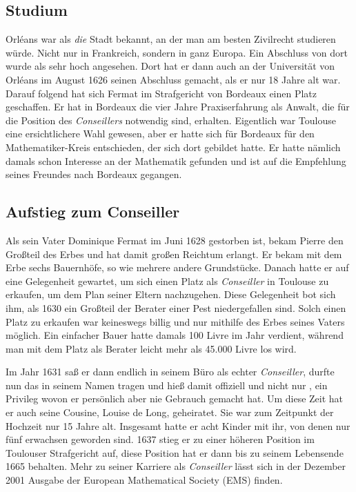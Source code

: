 \subsection{Studium} \label{sec:studium}
Orléans war als \textit{die} Stadt bekannt, an der man am besten Zivilrecht studieren würde. Nicht nur in Frankreich, sondern in ganz Europa. Ein Abschluss von dort wurde als sehr hoch angesehen. Dort hat er dann auch an der Universität von Orléans im August 1626 seinen Abschluss gemacht, als er nur 18 Jahre alt war. Darauf folgend hat sich Fermat im Strafgericht von Bordeaux einen Platz geschaffen. Er hat in Bordeaux die vier Jahre Praxiserfahrung als Anwalt, die für die Position des \textit{Conseillers} notwendig sind, erhalten. Eigentlich war Toulouse eine ersichtlichere Wahl gewesen, aber er hatte sich für Bordeaux für den Mathematiker-Kreis entschieden, der sich dort gebildet hatte. Er hatte nämlich damals schon Interesse an der Mathematik gefunden und ist auf die Empfehlung seines Freundes nach Bordeaux gegangen.

\subsection{Aufstieg zum Conseiller} \label{sec:aufstieg}
Als sein Vater Dominique Fermat im Juni 1628 gestorben ist, bekam Pierre den Großteil des Erbes und hat damit großen Reichtum erlangt. Er bekam mit dem Erbe sechs Bauernhöfe, so wie mehrere andere Grundstücke. Danach hatte er auf eine Gelegenheit gewartet, um sich einen Platz als \textit{Conseiller} in Toulouse zu erkaufen, um dem Plan seiner Eltern nachzugehen. Diese Gelegenheit bot sich ihm, als 1630 ein Großteil der Berater einer Pest niedergefallen sind. Solch einen Platz zu erkaufen war keineswegs billig und nur mithilfe des Erbes seines Vaters möglich. Ein einfacher Bauer hatte damals 100 Livre im Jahr verdient, während man mit dem Platz als Berater leicht mehr als 45.000 Livre los wird.

Im Jahr 1631 saß er dann endlich in seinem Büro als echter \textit{Conseiller}, durfte nun das \textit{} in seinem Namen tragen und hieß damit offiziell  und nicht nur , ein Privileg wovon er persönlich aber nie Gebrauch gemacht hat. Um diese Zeit hat er auch seine Cousine, Louise de Long, geheiratet. Sie war zum Zeitpunkt der Hochzeit nur 15 Jahre alt. Insgesamt hatte er acht Kinder mit ihr, von denen nur fünf erwachsen geworden sind. 1637 stieg er zu einer höheren Position im Toulouser Strafgericht auf, diese Position hat er dann bis zu seinem Lebensende 1665 behalten. Mehr zu seiner Karriere als \textit{Conseiller} lässt sich in der Dezember 2001 Ausgabe der European Mathematical Society (EMS) finden. \cite{barnerNewspaper}

